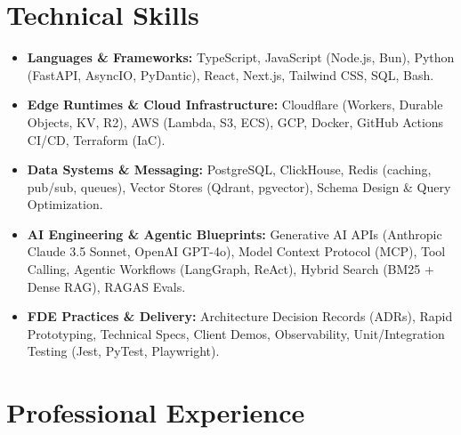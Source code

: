 \documentclass[a4paper,10pt]{article}
\begin{document}
\section{Technical Skills}
\begin{itemize}[leftmargin=1.2em, itemsep=2pt]
  \item \textbf{Languages \& Frameworks:} TypeScript, JavaScript (Node.js, Bun), Python (FastAPI, AsyncIO, PyDantic), React, Next.js, Tailwind CSS, SQL, Bash.
  \item \textbf{Edge Runtimes \& Cloud Infrastructure:} Cloudflare (Workers, Durable Objects, KV, R2), AWS (Lambda, S3, ECS), GCP, Docker, GitHub Actions CI/CD, Terraform (IaC).
  \item \textbf{Data Systems \& Messaging:} PostgreSQL, ClickHouse, Redis (caching, pub/sub, queues), Vector Stores (Qdrant, pgvector), Schema Design \& Query Optimization.
  \item \textbf{AI Engineering \& Agentic Blueprints:} Generative AI APIs (Anthropic Claude 3.5 Sonnet, OpenAI GPT-4o), Model Context Protocol (MCP), Tool Calling, Agentic Workflows (LangGraph, ReAct), Hybrid Search (BM25 + Dense RAG), RAGAS Evals.
  \item \textbf{FDE Practices \& Delivery:} Architecture Decision Records (ADRs), Rapid Prototyping, Technical Specs, Client Demos, Observability, Unit/Integration Testing (Jest, PyTest, Playwright).
\end{itemize}

\section{Professional Experience}
\end{document}
